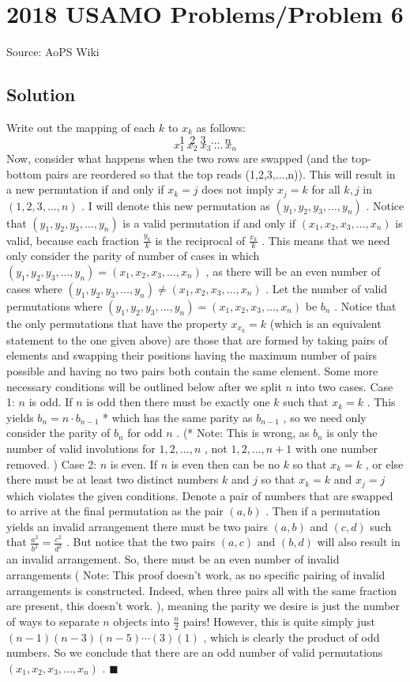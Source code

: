 \documentclass[12pt]{article}
\begin{document}
\section*{{2018 USAMO Problems/Problem 6}}
Source: AoPS Wiki

\subsection*{Solution}
Write out the mapping of each $k$ to $x_k$ as follows: \[1\ \ 2\ \ 3\ \ \dots \ \ n\] \[x_1\ x_2\ x_3\ \dots \ x_n\] Now, consider what happens when the two rows are swapped (and the top-bottom pairs are reordered so that the top reads (1,2,3,...,n)). This will result in a new permutation if and only if $x_k = j$ does not imply $x_j = k$ for all $k,j$ in $(1,2,3,\dots,n)$ . I will denote this new permutation as $(y_1,y_2,y_3,\dots,y_n)$ . Notice that $(y_1,y_2,y_3,\dots,y_n)$ is a valid permutation if and only if $(x_1,x_2,x_3,\dots,x_n)$ is valid, because each fraction $\frac{y_k}{k}$ is the reciprocal of $\frac{x_k}{k}$ . This means that we need only consider the parity of number of cases in which $(y_1,y_2,y_3,\dots, y_n) = (x_1,x_2,x_3,\dots, x_n)$ , as there will be an even number of cases where $(y_1,y_2,y_3,\dots, y_n) \ne (x_1,x_2,x_3,\dots, x_n)$ . Let the number of valid permutations where $(y_1,y_2,y_3,\dots, y_n) = (x_1,x_2,x_3,\dots, x_n)$ be $b_n$ . Notice that the only permutations that have the property $x_{x_k}=k$ (which is an equivalent statement to the one given above) are those that are formed by taking pairs of elements and swapping their positions having the maximum number of pairs possible and having no two pairs both contain the same element. Some more necessary conditions will be outlined below after we split $n$ into two cases. Case 1: $n$ is odd. If $n$ is odd then there must be exactly one $k$ such that $x_k = k$ . This yields $b_n=n\cdot b_{n-1}$ * which has the same parity as $b_{n-1}$ , so we need only consider the parity of $b_n$ for odd $n$ . (* Note: This is wrong, as $b_n$ is only the number of valid involutions for $1,2,...,n$ , not $1,2,...,n+1$ with one number removed. ) Case 2: $n$ is even. If $n$ is even then can be no $k$ so that $x_k=k$ , or else there must be at least two distinct numbers $k$ and $j$ so that $x_k=k$ and $x_j=j$ which violates the given conditions. Denote a pair of numbers that are swapped to arrive at the final permutation as the pair $(a,b)$ . Then if a permutation yields an invalid arrangement there must be two pairs $(a,b)$ and $(c,d)$ such that $\frac{a^2}{b^2} = \frac{c^2}{d^2}$ . But notice that the two pairs $(a,c)$ and $(b,d)$ will also result in an invalid arrangement. So, there must be an even number of invalid arrangements ( Note: This proof doesn't work, as no specific pairing of invalid arrangements is constructed. Indeed, when three pairs all with the same fraction are present, this doesn't work. ), meaning the parity we desire is just the number of ways to separate $n$ objects into $\frac n2$ pairs! However, this is quite simply just $(n-1)(n-3)(n-5)\cdots(3)(1)$ , which is clearly the product of odd numbers. So we conclude that there are an odd number of valid permutations $(x_1,x_2,x_3,\dots,x_n)$ . $\blacksquare$
\end{document}
